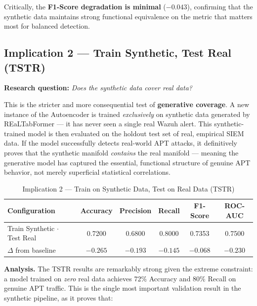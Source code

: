 Critically, the \textbf{F1-Score degradation is minimal} ($-0.043$), confirming that the synthetic data maintains strong functional equivalence on the metric that matters most for balanced detection.

\subsection{Implication 2 — Train Synthetic, Test Real (TSTR)}

\textbf{Research question:} \textit{Does the synthetic data cover real data?}

This is the stricter and more consequential test of \textbf{generative coverage}. A new instance of the Autoencoder is trained \textit{exclusively} on synthetic data generated by REaLTabFormer --- it has never seen a single real Wazuh alert. This synthetic-trained model is then evaluated on the holdout test set of real, empirical SIEM data. If the model successfully detects real-world APT attacks, it definitively proves that the synthetic manifold \textit{contains} the real manifold --- meaning the generative model has captured the essential, functional structure of genuine APT behavior, not merely superficial statistical correlations.

\begin{table}[H]
    \centering
    \caption{Implication 2 — Train on Synthetic Data, Test on Real Data (TSTR)}
    \label{tab:tstr_results}
    \begin{tabular}{lccccc}
        \toprule
        \textbf{Configuration} & \textbf{Accuracy} & \textbf{Precision} & \textbf{Recall} & \textbf{F1-Score} & \textbf{ROC-AUC} \\
        \midrule
        Train Synthetic $\cdot$ Test Real & 0.7200 & 0.6800 & 0.8000 & 0.7353 & 0.7500 \\
        \midrule
        $\Delta$ from baseline & $-0.265$ & $-0.193$ & $-0.145$ & $-0.068$ & $-0.230$ \\
        \bottomrule
    \end{tabular}
\end{table}

\textbf{Analysis.} The TSTR results are remarkably strong given the extreme constraint: a model trained on \textit{zero} real data achieves 72\% Accuracy and 80\% Recall on genuine APT traffic. This is the single most important validation result in the synthetic pipeline, as it proves that:


